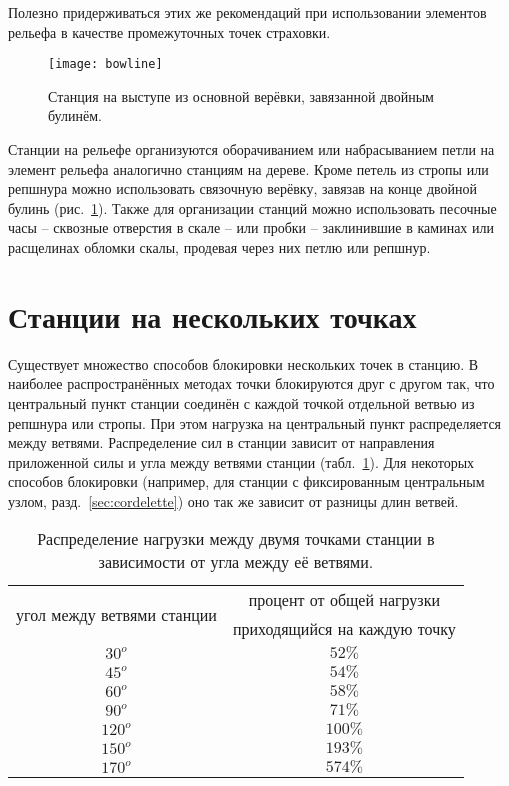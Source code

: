 \documentclass[fleqn, 12pt]{extarticle}
\begin{document}
    Полезно придерживаться этих же рекомендаций при использовании элементов рельефа в качестве промежуточных точек страховки.
    \begin{figure}[h]
        \centering
        \texttt{[image: bowline]}
        \caption{Станция на выступе из основной верёвки, завязанной двойным булинём.}\label{fig:bowline}
    \end{figure}
    
    Станции на рельефе организуются оборачиванием или набрасыванием петли на элемент рельефа аналогично станциям на дереве. Кроме петель из стропы или репшнура можно использовать
    связочную верёвку, завязав на конце двойной булинь (рис.~\ref{fig:bowline}). Также для организации станций можно использовать песочные часы -- сквозные отверстия в скале --
    или пробки -- заклинившие в каминах или расщелинах обломки скалы, продевая через них петлю или репшнур.

\section{Станции на нескольких точках}\label{sec:multipoint.anchors}
    Существует множество способов блокировки нескольких точек в станцию. В наиболее распространённых методах точки блокируются друг с другом
    так, что центральный пункт станции соединён с каждой точкой отдельной ветвью из репшнура или стропы. При этом нагрузка на центральный пункт распределяется между ветвями.
    Распределение сил в станции зависит от направления приложенной силы и угла между ветвями станции
    (табл.~\ref{tab:angle}). Для некоторых способов блокировки (например, для станции с фиксированным центральным узлом, разд.~\ref{sec:cordelette}) оно так же зависит от разницы длин ветвей.
    \begin{table}[h]
        \centering
        \begin{tabular}{|c|c|}
            \hline
            \multirow{2}{*}{угол между ветвями станции} & процент от общей нагрузки \\ & приходящийся на каждую точку \\
            \hline
            $30^o$ & $52\%$ \\
            $45^o$ & $54\%$ \\
            $60^o$ & $58\%$ \\
            $90^o$ & $71\%$ \\
            $120^o$ & $100\%$ \\
            $150^o$ & $193\%$ \\
            $170^o$ & $574\%$ \\
            \hline
        \end{tabular}
        \caption{Распределение нагрузки между двумя точками станции в зависимости от угла между её ветвями.}\label{tab:angle}
    \end{table}
    
\end{document}
